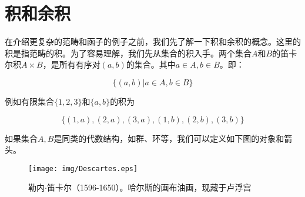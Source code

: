 \documentclass{article}
\begin{document}
\begin{Exercise}
\end{Exercise}

\section{积和余积}

在介绍更复杂的范畴和函子的例子之前，我们先了解一下积和余积的概念。这里的积是指范畴的积。为了容易理解，我们先从集合的积入手。两个集合$A$和$B$的笛卡尔积$A \times B$，是所有有序对$(a, b)$的集合。其中$a \in A, b \in B$。即：

\[
\{(a, b) | a \in A, b \in B\}
\]

例如有限集合$\{1, 2, 3\}$和$\{a, b\}$的积为

\[
\{(1, a), (2, a), (3, a), (1, b), (2, b), (3, b)\}
\]

如果集合$A, B$是同类的代数结构，如群、环等，我们可以定义如下图的对象和箭头。

\begin{center}
\end{center}

\begin{figure}[htbp]
 \centering
 \texttt{[image: img/Descartes.eps]}
 \captionsetup{labelformat=empty}
 \caption{勒内$\cdot$笛卡尔（1596-1650）。哈尔斯的画布油画，现藏于卢浮宫}
 \label{fig:Decartes}
\end{figure}
\end{document}
